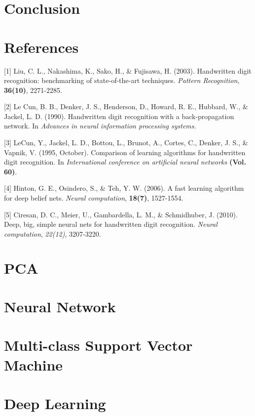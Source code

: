 \documentclass{article} %
\begin{document}
\section{Conclusion} \label{Conclu}

\section{References}

\small{
[1] Liu, C. L., Nakashima, K., Sako, H., \& Fujisawa, H. (2003). Handwritten
digit recognition: benchmarking of state-of-the-art techniques. {\it Pattern
    Recognition}, {\bf 36(10)}, 2271-2285.

[2] Le Cun, B. B., Denker, J. S., Henderson, D., Howard, R. E., Hubbard, W., \&
Jackel, L. D. (1990). Handwritten digit recognition with a back-propagation
network. In {\it Advances in neural information processing systems.}

[3] LeCun, Y., Jackel, L. D., Bottou, L., Brunot, A., Cortes, C., Denker, J.
S., \& Vapnik, V. (1995, October). Comparison of learning algorithms for
handwritten digit recognition. In {\it International conference on artificial
    neural networks} {\bf (Vol. 60)}.

[4] Hinton, G. E., Osindero, S., \& Teh, Y. W. (2006). A fast learning
algorithm for deep belief nets. {\it Neural computation}, {\bf 18(7)}, 1527-1554.

[5] Ciresan, D. C., Meier, U., Gambardella, L. M., \& Schmidhuber, J. (2010).
Deep, big, simple neural nets for handwritten digit recognition. {\it Neural
    computation}, {\it 22(12)}, 3207-3220.
}

\newpage
\appendix
\section{PCA}
\section{Neural Network}
\section{Multi-class Support Vector Machine}
\section{Deep Learning}
\end{document}
